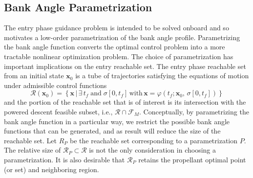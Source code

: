 \subsection{Bank Angle Parametrization}
The entry phase guidance problem is intended to be solved onboard and so motivates a low-order parametrization of the bank angle profile. Parametrizing the bank angle function converts the optimal control problem into a more tractable nonlinear optimization problem. The choice of parametrization has important implications on the entry reachable set. The entry phase reachable set from an initial state $ \mathbf{x}_0$ is a tube of trajectories satisfying the equations of motion under admissible control functions 
\begin{equation*}
\mathcal{R}(\mathbf{x}_0)=\left\{\mathbf{x} \,| \,\exists\, t_f \;\mathrm{and}\; \sigma[0, t_f] \,\mathrm{with}\, \mathbf{x} = \varphi(t_f;\mathbf{x}_0,\, \sigma[0, t_f])  \right\}
\end{equation*}
and the portion of the reachable set that is of interest is its intersection with the powered descent feasible subset, i.e., $\mathcal{R} \cap \mathcal{F}_M$. Conceptually, by parametrizing the bank angle function in a particular way, we restrict the possible bank angle functions that can be generated, and as result will reduce the size of the reachable set. Let $R_P$ be the reachable set corresponding to a parametrization $ P $.
The relative size of $\mathcal{R}_P \subset \mathcal{R}$ is not the only consideration in choosing a parametrization. 
It is also desirable that $\mathcal{R}_P$ retains the propellant optimal point (or set) and neighboring region. 
